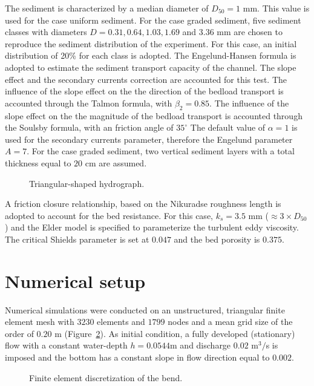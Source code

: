 The sediment is characterized by a median diameter of $D_{50}=1$ mm. This value is used for the case uniform sediment.
For the case graded sediment, five sediment classes with diameters $D=0.31, 0.64, 1.03, 1.69$ and $3.36$ mm are chosen to
reproduce the sediment distribution of the experiment. For this case, an initial distribution of 20\% for each class is adopted.
The Engelund-Hansen formula is adopted to estimate the sediment transport capacity of the channel.
The slope effect and the secondary currents correction are accounted for this test.
The influence of the slope effect on the the direction of the bedload transport is accounted through the Talmon formula, with $\beta_2=0.85$.
The influence of the slope effect on the the magnitude of the bedload transport is accounted through the Soulsby formula, with an friction angle of $35^{\circ}$
The default value of $\alpha=1$ is used for the secondary currents parameter, therefore the Engelund parameter $A=7$.
For the case graded sediment, two vertical sediment layers with a total thickness equal to $20$ cm are assumed.

\begin{figure}[!h]
\centering
{}
 \caption{Triangular-shaped hydrograph.}\label{fig:hydro}
\end{figure}

A friction closure relationship, based on the Nikuradse roughness length is adopted to
account for the bed resistance. For this case, $k_s=3.5$ mm ($\approx 3\times D_{50}$) and the Elder model is specified to parameterize the turbulent eddy viscosity.
The critical Shields parameter is set at $0.047$ and the bed porosity is $0.375$.


%
%
\section{Numerical setup}
%
Numerical simulations were conducted on an unstructured, triangular finite element mesh with
$3230$ elements and $1799$ nodes and a mean grid size of the order of $0.20$ m (Figure~\ref{fig:mesh}).
As initial condition, a fully developed (stationary) flow with a constant water-depth $h = 0.0544$m and discharge $0.02$ m$^3/$s is imposed and the bottom has a constant slope in flow direction equal to $0.002$.

\begin{figure} [!h]
\centering
{}
 \caption{Finite element discretization of the bend.}\label{fig:mesh}
\end{figure}

